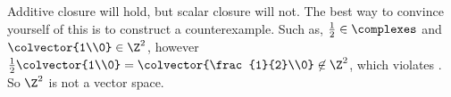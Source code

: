 %
Additive closure will hold, but scalar closure will not.  The best way to convince yourself of this is to construct a counterexample.  Such as, $\frac{1}{2}\in\complexes$ and $\colvector{1\\0}\in\Z^2$, however $\frac{1}{2}\colvector{1\\0}=\colvector{\frac{1}{2}\\0}\not\in\Z^2$, which violates .  So $\Z^2$ is not a vector space.